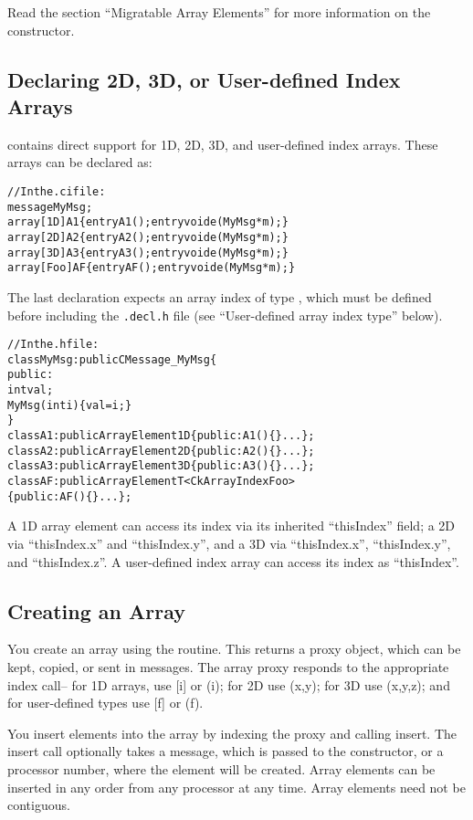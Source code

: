 Read the section ``Migratable Array Elements'' for more
information on the  constructor. 


\subsection{Declaring 2D, 3D, or User-defined Index Arrays}

\charmpp{} contains direct support for 1D, 2D, 3D, and user-defined
index arrays.  These arrays can be declared as:

\begin{alltt}
//In the .ci file:
message MyMsg;
array [1D] A1 \{ entry A1(); entry void e(MyMsg *m);\}
array [2D] A2 \{ entry A2(); entry void e(MyMsg *m);\}
array [3D] A3 \{ entry A3(); entry void e(MyMsg *m);\}
array [Foo] AF \{ entry AF(); entry void e(MyMsg *m);\}
\end{alltt}

The last declaration expects an array index of type ,
which must be defined before including the \texttt{.decl.h} file 
(see ``User-defined array index type'' below).  

\begin{alltt}
//In the .h file:
class MyMsg: public CMessage_MyMsg \{
public: 
  int val;
  MyMsg(int i) \{val=i;\}
\}
class A1:public ArrayElement1D \{ public: A1()\{\} ...\};
class A2:public ArrayElement2D \{ public: A2()\{\} ...\};
class A3:public ArrayElement3D \{ public: A3()\{\} ...\};
class AF:public ArrayElementT<CkArrayIndexFoo> 
  \{ public: AF()\{\} ...\};
\end{alltt}

A 1D array element can access its index via its inherited ``thisIndex''
field; a 2D via ``thisIndex.x'' and ``thisIndex.y'', and a 3D via
``thisIndex.x'', ``thisIndex.y'', and ``thisIndex.z''.  A user-defined
index array can access its index as ``thisIndex''.


\subsection{Creating an Array}

You create an array using the 
routine.  This returns a proxy object, which can
be kept, copied, or sent in messages.
The array proxy responds to the appropriate index call--
for 1D arrays, use [i] or (i); for 2D use (x,y); for 3D
use (x,y,z); and for user-defined types use [f] or (f).

You insert elements into the array by indexing the proxy
and calling insert.  The insert call optionally takes 
a message, which is passed to the constructor, or a
processor number, where the element will be created.
Array elements can be inserted in any order from 
any processor at any time.  Array elements need not 
be contiguous.

